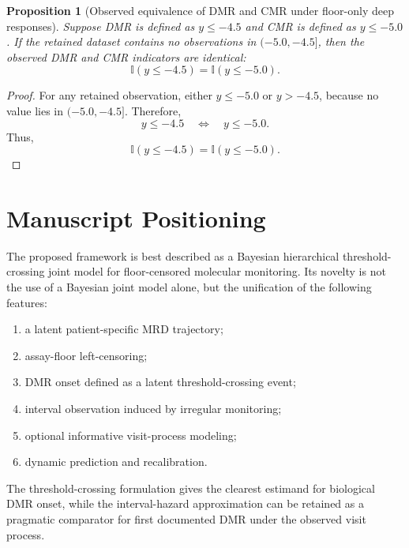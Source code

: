 \documentclass[11pt]{article}
\newtheorem{proposition}{Proposition}
\theoremstyle{remark}
\newcommand{\Ind}{\mathbb{I}}
\begin{document}
\begin{proposition}[Observed equivalence of DMR and CMR under floor-only deep responses]
Suppose DMR is defined as \(y\leq -4.5\) and CMR is defined as \(y\leq -5.0\). If the retained dataset contains no observations in \((-5.0,-4.5]\), then the observed DMR and CMR indicators are identical:
\[
\Ind(y\leq -4.5)=\Ind(y\leq -5.0).
\]
\end{proposition}

\begin{proof}
For any retained observation, either \(y\leq -5.0\) or \(y>-4.5\), because no value lies in \((-5.0,-4.5]\). Therefore,
\[
y\leq -4.5
\quad\Longleftrightarrow\quad
y\leq -5.0.
\]
Thus,
\[
\Ind(y\leq -4.5)=\Ind(y\leq -5.0).
\]
\end{proof}

\section{Manuscript Positioning}

The proposed framework is best described as a Bayesian hierarchical threshold-crossing joint model for floor-censored molecular monitoring. Its novelty is not the use of a Bayesian joint model alone, but the unification of the following features:
\begin{enumerate}[label=(\roman*)]
\item a latent patient-specific MRD trajectory;
\item assay-floor left-censoring;
\item DMR onset defined as a latent threshold-crossing event;
\item interval observation induced by irregular monitoring;
\item optional informative visit-process modeling;
\item dynamic prediction and recalibration.
\end{enumerate}

The threshold-crossing formulation gives the clearest estimand for biological DMR onset, while the interval-hazard approximation can be retained as a pragmatic comparator for first documented DMR under the observed visit process.
\end{document}
